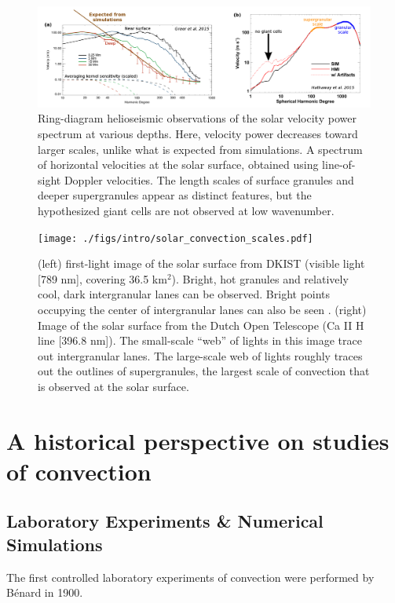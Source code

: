 \begin{figure}[ht]
\includegraphics[width=\textwidth]{./figs/intro/conv_conundrum.pdf}
\caption[Solar velocity power spectra.]
{
	\citep[a, annoted Fig.~3 from][]{greer&all2015} Ring-diagram helioseismic observations of the solar velocity power spectrum at various depths.
	Here, velocity power decreases toward larger scales, unlike what is expected from simulations.
	\citep[b, annotated Fig.~8 from][]{hathaway&all2015} A spectrum of horizontal velocities at the solar surface, obtained using line-of-sight Doppler velocities.
	The length scales of surface granules and deeper supergranules appear as distinct features, but the hypothesized giant cells are not observed at low wavenumber.
	\label{fig:conv_conundrum} 
}
\end{figure}

\begin{figure}[ht!]
\texttt{[image: ./figs/intro/solar\_convection\_scales.pdf]}
\caption[Solar velocity power spectra.]
{
	(left) first-light image of the solar surface from DKIST (visible light [789 nm], covering 36.5 km$^2$).
	Bright, hot granules and relatively cool, dark intergranular lanes can be observed.
	Bright points occupying the center of intergranular lanes can also be seen \citep{vankooten&cranmer2017}.
	(right) Image of the solar surface from the Dutch Open Telescope (Ca II H line [396.8 nm]).
	The small-scale ``web'' of lights in this image trace out intergranular lanes.
	The large-scale web of lights roughly traces out the outlines of supergranules, the largest scale of convection that is observed at the solar surface.
	\label{fig:solar_convection_scales} 
}
\end{figure}




\section{A historical perspective on studies of convection}



\subsection{Laboratory Experiments \& Numerical Simulations}
The first controlled laboratory experiments of convection were performed by B\'{e}nard in 1900.


